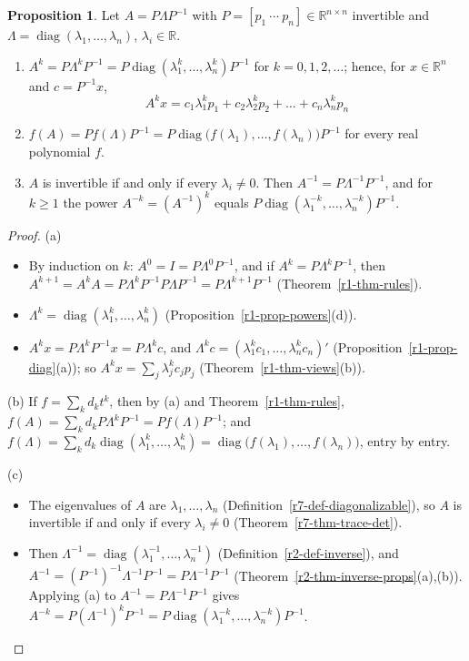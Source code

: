 \documentclass[12pt]{article}
\newcommand{\R}{\mathbb R}
\DeclareMathOperator{\diag}{diag}
\theoremstyle{definition}
\newtheorem{proposition}[theorem]{Proposition}
\begin{document}
\begin{proposition}\label{r7-prop-diag-powers}
Let \(A=P\Lambda P^{-1}\) with \(P=[p_1\ \cdots\ p_n]\in\R^{n\times n}\) invertible and
\(\Lambda=\diag(\lambda_1,\dots,\lambda_n)\), \(\lambda_i\in\R\).
\begin{enumerate}
\item \(A^k=P\Lambda^kP^{-1}=P\diag(\lambda_1^k,\dots,\lambda_n^k)P^{-1}\) for \(k=0,1,2,\dots\); hence, for \(x\in\R^n\)
and \(c=P^{-1}x\),
\[
A^kx=c_1\lambda_1^kp_1+c_2\lambda_2^kp_2+\dots+c_n\lambda_n^kp_n
\]
\item \(f(A)=Pf(\Lambda)P^{-1}=P\diag\bigl(f(\lambda_1),\dots,f(\lambda_n)\bigr)P^{-1}\) for every real polynomial \(f\).
\item \(A\) is invertible if and only if every \(\lambda_i\ne0\). Then \(A^{-1}=P\Lambda^{-1}P^{-1}\), and for \(k\geqslant1\) the
power \(A^{-k}=(A^{-1})^k\) equals \(P\diag(\lambda_1^{-k},\dots,\lambda_n^{-k})P^{-1}\).
\end{enumerate}
\end{proposition}
\begin{proof}
(a)
\begin{itemize}
\item By induction on \(k\): \(A^0=I=P\Lambda^0P^{-1}\), and if \(A^k=P\Lambda^kP^{-1}\), then
\(A^{k+1}=A^kA=P\Lambda^kP^{-1}P\Lambda P^{-1}=P\Lambda^{k+1}P^{-1}\) (Theorem~\ref{r1-thm-rules}).
\item \(\Lambda^k=\diag(\lambda_1^k,\dots,\lambda_n^k)\) (Proposition~\ref{r1-prop-powers}(d)).
\item \(A^kx=P\Lambda^kP^{-1}x=P\Lambda^kc\), and \(\Lambda^kc=(\lambda_1^kc_1,\dots,\lambda_n^kc_n)'\)
(Proposition~\ref{r1-prop-diag}(a)); so \(A^kx=\sum_j\lambda_j^kc_jp_j\) (Theorem~\ref{r1-thm-views}(b)).
\end{itemize}
(b) If \(f=\sum_kd_kt^k\), then by (a) and Theorem~\ref{r1-thm-rules}, \(f(A)=\sum_kd_kP\Lambda^kP^{-1}=Pf(\Lambda)P^{-1}\);
and \(f(\Lambda)=\sum_kd_k\diag(\lambda_1^k,\dots,\lambda_n^k)=\diag\bigl(f(\lambda_1),\dots,f(\lambda_n)\bigr)\), entry by
entry.

(c)
\begin{itemize}
\item The eigenvalues of \(A\) are \(\lambda_1,\dots,\lambda_n\) (Definition~\ref{r7-def-diagonalizable}), so \(A\) is
invertible if and only if every \(\lambda_i\ne0\) (Theorem~\ref{r7-thm-trace-det}).
\item Then \(\Lambda^{-1}=\diag(\lambda_1^{-1},\dots,\lambda_n^{-1})\) (Definition~\ref{r2-def-inverse}), and
\(A^{-1}=(P^{-1})^{-1}\Lambda^{-1}P^{-1}=P\Lambda^{-1}P^{-1}\) (Theorem~\ref{r2-thm-inverse-props}(a),(b)). Applying (a) to
\(A^{-1}=P\Lambda^{-1}P^{-1}\) gives \(A^{-k}=P(\Lambda^{-1})^kP^{-1}=P\diag(\lambda_1^{-k},\dots,\lambda_n^{-k})P^{-1}\).\qedhere
\end{itemize}
\end{proof}
\end{document}
